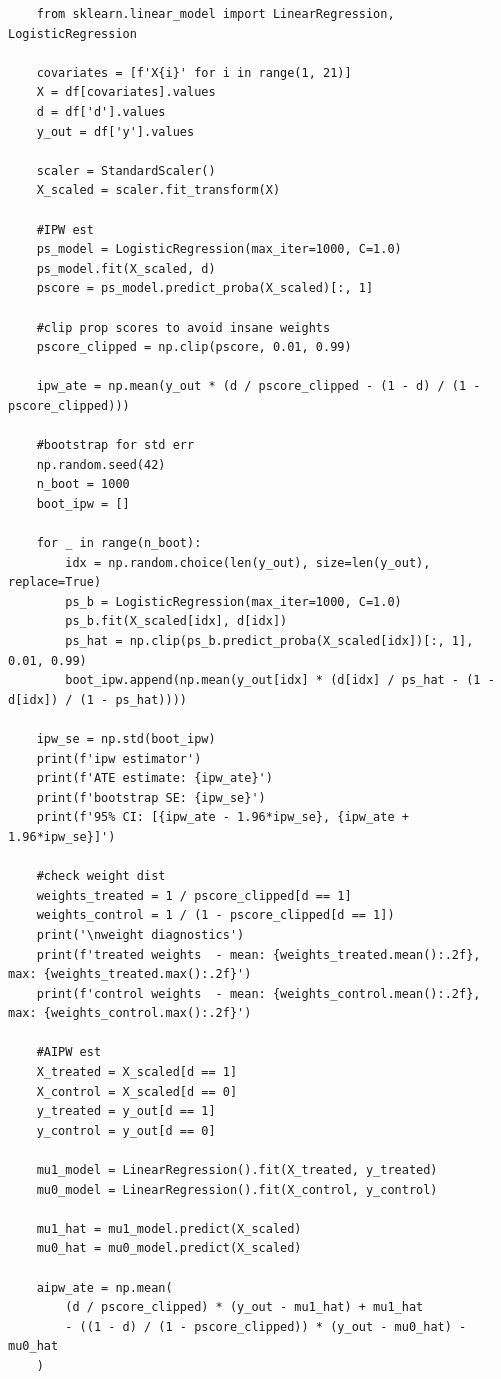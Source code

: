 \documentclass[10pt]{article}
\begin{document}
\begin{lstlisting}
    from sklearn.linear_model import LinearRegression, LogisticRegression

    covariates = [f'X{i}' for i in range(1, 21)]
    X = df[covariates].values 
    d = df['d'].values
    y_out = df['y'].values

    scaler = StandardScaler()
    X_scaled = scaler.fit_transform(X)

    #IPW est
    ps_model = LogisticRegression(max_iter=1000, C=1.0)
    ps_model.fit(X_scaled, d)
    pscore = ps_model.predict_proba(X_scaled)[:, 1]

    #clip prop scores to avoid insane weights 
    pscore_clipped = np.clip(pscore, 0.01, 0.99)

    ipw_ate = np.mean(y_out * (d / pscore_clipped - (1 - d) / (1 - pscore_clipped)))

    #bootstrap for std err 
    np.random.seed(42)
    n_boot = 1000
    boot_ipw = []

    for _ in range(n_boot):
        idx = np.random.choice(len(y_out), size=len(y_out), replace=True)
        ps_b = LogisticRegression(max_iter=1000, C=1.0)
        ps_b.fit(X_scaled[idx], d[idx])
        ps_hat = np.clip(ps_b.predict_proba(X_scaled[idx])[:, 1], 0.01, 0.99)
        boot_ipw.append(np.mean(y_out[idx] * (d[idx] / ps_hat - (1 - d[idx]) / (1 - ps_hat))))

    ipw_se = np.std(boot_ipw)
    print(f'ipw estimator')
    print(f'ATE estimate: {ipw_ate}')
    print(f'bootstrap SE: {ipw_se}')
    print(f'95% CI: [{ipw_ate - 1.96*ipw_se}, {ipw_ate + 1.96*ipw_se}]')

    #check weight dist
    weights_treated = 1 / pscore_clipped[d == 1]
    weights_control = 1 / (1 - pscore_clipped[d == 1])
    print('\nweight diagnostics')
    print(f'treated weights  - mean: {weights_treated.mean():.2f}, max: {weights_treated.max():.2f}')
    print(f'control weights  - mean: {weights_control.mean():.2f}, max: {weights_control.max():.2f}')

    #AIPW est
    X_treated = X_scaled[d == 1]
    X_control = X_scaled[d == 0]
    y_treated = y_out[d == 1]
    y_control = y_out[d == 0]

    mu1_model = LinearRegression().fit(X_treated, y_treated)
    mu0_model = LinearRegression().fit(X_control, y_control)

    mu1_hat = mu1_model.predict(X_scaled)
    mu0_hat = mu0_model.predict(X_scaled)

    aipw_ate = np.mean(
        (d / pscore_clipped) * (y_out - mu1_hat) + mu1_hat
        - ((1 - d) / (1 - pscore_clipped)) * (y_out - mu0_hat) - mu0_hat
    )


\end{lstlisting}
\end{document}
